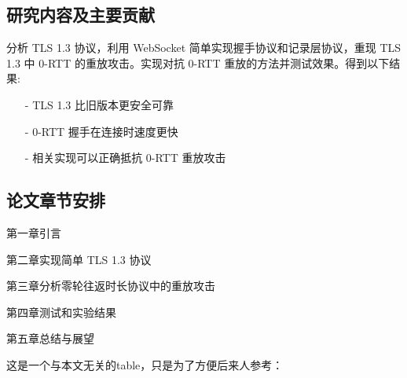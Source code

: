 \subsection{研究内容及主要贡献}

分析 TLS 1.3 协议，利用 WebSocket 简单实现握手协议和记录层协议，重现 TLS 1.3 中 0-RTT 的重放攻击。实现对抗 0-RTT 重放的方法并测试效果。得到以下结果:

\begin{itemize}
  \item[-] TLS 1.3 比旧版本更安全可靠
  \item[-] 0-RTT 握手在连接时速度更快
  \item[-] 相关实现可以正确抵抗 0-RTT 重放攻击
\end{itemize}

\subsection{论文章节安排}
\label{sec:arrangement}

第一章引言

第二章实现简单 TLS 1.3 协议

第三章分析零轮往返时长协议中的重放攻击

第四章测试和实验结果

第五章总结与展望

这是一个与本文无关的table，只是为了方便后来人参考：


\newpage